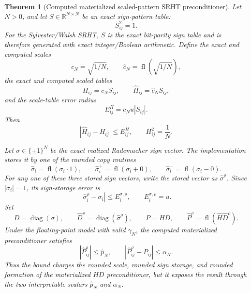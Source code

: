 \documentclass[11pt]{article}
\newcommand{\R}{\mathbb{R}}
\newcommand{\fl}{\operatorname{fl}}
\newcommand{\diag}{\operatorname{diag}}
\newtheorem{theorem}{Theorem}
\theoremstyle{remark}
\begin{document}
\begin{theorem}[Computed materialized scaled-pattern SRHT preconditioner]
Let \(N>0\), and let \(S\in\R^{N\times N}\) be an exact sign-pattern table:
\[
  S_{ij}^2=1 .
\]
For the Sylvester/Walsh SRHT, \(S\) is the exact bit-parity sign table and is
therefore generated with exact integer/Boolean arithmetic.  Define the exact
and computed scales
\[
  c_N=\sqrt{1/N},\qquad \widehat c_N=\fl(\sqrt{1/N}),
\]
the exact and computed scaled tables
\[
  H_{ij}=c_NS_{ij},\qquad \widehat H_{ij}=\widehat c_NS_{ij},
\]
and the scale-table error radius
\[
  E^H_{ij}=c_Nu|S_{ij}|.
\]
Then
\[
  |\widehat H_{ij}-H_{ij}|\le E^H_{ij},
  \qquad H_{ij}^2=\frac1N .
\]

Let \(\sigma\in\{\pm1\}^N\) be the exact realized Rademacher sign vector.  The
implementation stores it by one of the rounded copy routines
\[
  \widehat\sigma_i=\fl(\sigma_i\cdot1),\qquad
  \widehat\sigma_i^+=\fl(\sigma_i+0),\qquad
  \widehat\sigma_i^-=\fl(\sigma_i-0).
\]
For any one of these three stored sign vectors, write the stored vector as
\(\widehat\sigma^{\rho}\).  Since \(|\sigma_i|=1\), its sign-storage error is
\[
  |\widehat\sigma^{\rho}_i-\sigma_i|\le E^{\sigma,\rho}_i,
  \qquad E^{\sigma,\rho}_i=u .
\]
Set
\[
  D=\diag(\sigma),\qquad
  \widehat D^\rho=\diag(\widehat\sigma^\rho),\qquad
  P=HD,\qquad
  \widehat P^\rho=\fl(\widehat H\widehat D^\rho).
\]
Under the floating-point model with valid \(\gamma_N\), the computed
materialized preconditioner satisfies
\[
  |\widehat P^\rho_{ij}|\le \widehat p_N,
  \qquad
  |\widehat P^\rho_{ij}-P_{ij}|\le \alpha_N .
\]
Thus the bound charges the rounded scale, rounded sign storage, and rounded
formation of the materialized \(HD\) preconditioner, but it exposes the result
through the two interpretable scalars \(\widehat p_N\) and \(\alpha_N\).
\end{theorem}
\end{document}
